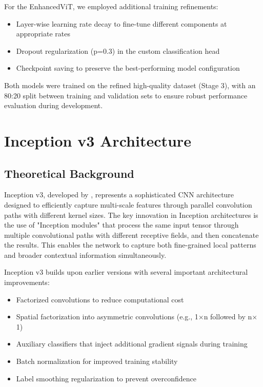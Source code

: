 \documentclass[a4paper,12pt]{article}
\begin{document}
For the EnhancedViT, we employed additional training refinements:

\begin{itemize}
    \item Layer-wise learning rate decay to fine-tune different components at appropriate rates
    \item Dropout regularization (p=0.3) in the custom classification head
    \item Checkpoint saving to preserve the best-performing model configuration
\end{itemize}

Both models were trained on the refined high-quality dataset (Stage 3), with an 80:20 split between training and validation sets to ensure robust performance evaluation during development.

\section{Inception v3 Architecture}

\subsection{Theoretical Background}

Inception v3, developed by \citep{szegedy2016rethinking}, represents a sophisticated CNN architecture designed to efficiently capture multi-scale features through parallel convolution paths with different kernel sizes. The key innovation in Inception architectures is the use of "Inception modules" that process the same input tensor through multiple convolutional paths with different receptive fields, and then concatenate the results. This enables the network to capture both fine-grained local patterns and broader contextual information simultaneously.

Inception v3 builds upon earlier versions with several important architectural improvements:

\begin{itemize}
    \item Factorized convolutions to reduce computational cost
    \item Spatial factorization into asymmetric convolutions (e.g., 1$\times$n followed by n$\times$1)
    \item Auxiliary classifiers that inject additional gradient signals during training
    \item Batch normalization for improved training stability
    \item Label smoothing regularization to prevent overconfidence
\end{itemize}
\end{document}
